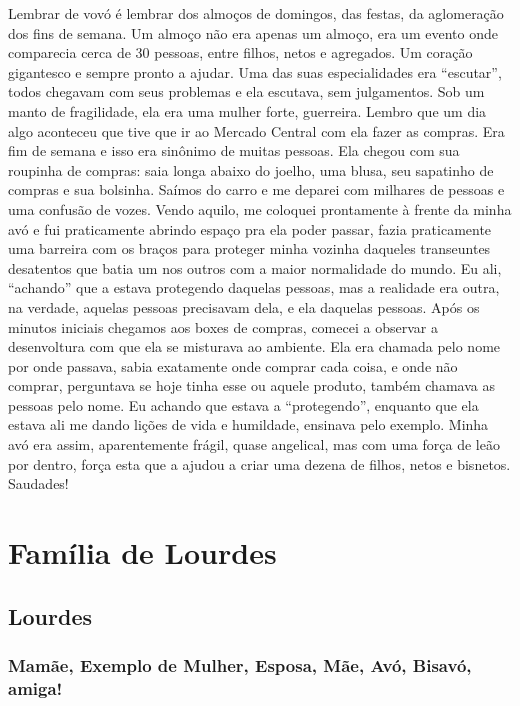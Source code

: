 \documentclass[
  brazil,
  a6paper,
  oneside,
  landscape,
  14pt]{scrbook}
\begin{document}
Lembrar de vovó é lembrar dos almoços de domingos, das festas, da
aglomeração dos fins de semana. Um almoço não era apenas um almoço, era
um evento onde comparecia cerca de 30 pessoas, entre filhos, netos e
agregados. Um coração gigantesco e sempre pronto a ajudar. Uma das suas
especialidades era ``escutar'', todos chegavam com seus problemas e ela
escutava, sem julgamentos. Sob um manto de fragilidade, ela era uma
mulher forte, guerreira. Lembro que um dia algo aconteceu que tive que
ir ao Mercado Central com ela fazer as compras. Era fim de semana e isso
era sinônimo de muitas pessoas. Ela chegou com sua roupinha de compras:
saia longa abaixo do joelho, uma blusa, seu sapatinho de compras e sua
bolsinha. Saímos do carro e me deparei com milhares de pessoas e uma
confusão de vozes. Vendo aquilo, me coloquei prontamente à frente da
minha avó e fui praticamente abrindo espaço pra ela poder passar, fazia
praticamente uma barreira com os braços para proteger minha vozinha
daqueles transeuntes desatentos que batia um nos outros com a maior
normalidade do mundo. Eu ali, ``achando'' que a estava protegendo
daquelas pessoas, mas a realidade era outra, na verdade, aquelas pessoas
precisavam dela, e ela daquelas pessoas. Após os minutos iniciais
chegamos aos boxes de compras, comecei a observar a desenvoltura com que
ela se misturava ao ambiente. Ela era chamada pelo nome por onde
passava, sabia exatamente onde comprar cada coisa, e onde não comprar,
perguntava se hoje tinha esse ou aquele produto, também chamava as
pessoas pelo nome. Eu achando que estava a ``protegendo'', enquanto que
ela estava ali me dando lições de vida e humildade, ensinava pelo
exemplo. Minha avó era assim, aparentemente frágil, quase angelical, mas
com uma força de leão por dentro, força esta que a ajudou a criar uma
dezena de filhos, netos e bisnetos. Saudades!

\hypertarget{famuxedlia-de-lourdes}{%
\chapter{Família de Lourdes}\label{famuxedlia-de-lourdes}}

\hypertarget{lourdes}{%
\section{Lourdes}\label{lourdes}}

\hypertarget{mamuxe3e-exemplo-de-mulher-esposa-muxe3e-avuxf3-bisavuxf3-amiga}{%
\subsection{Mamãe, Exemplo de Mulher, Esposa, Mãe, Avó, Bisavó,
amiga!}\label{mamuxe3e-exemplo-de-mulher-esposa-muxe3e-avuxf3-bisavuxf3-amiga}}
\end{document}
